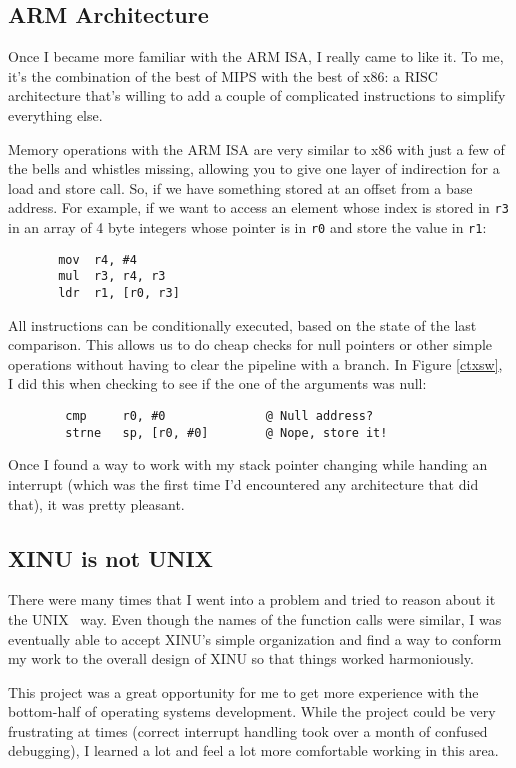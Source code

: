 \documentclass[12pt]{article}
\newcommand{\code}[1]{{\tt #1}}
\newcommand{\unix}[0]{U{\small NIX}}
\begin{document}
\subsection{ARM Architecture}

Once I became more familiar with the ARM ISA, I really came to like it. To me,
it's the combination of the best of MIPS with the best of x86: a RISC
architecture that's willing to add a couple of complicated instructions to
simplify everything else.

Memory operations with the ARM ISA are very similar to x86 with just a few of
the bells and whistles missing, allowing you to give one layer of indirection
for a load and store call. So, if we have something stored at an offset from a
base address. For example, if we want to access an element whose index is
stored in \code{r3} in an array of 4 byte integers whose pointer is in
\code{r0} and store the value in \code{r1}:

\begin{verbatim}
       mov  r4, #4
       mul  r3, r4, r3
       ldr  r1, [r0, r3]
\end{verbatim}

All instructions can be conditionally executed, based on the state of the last
comparison. This allows us to do cheap checks for null pointers or other simple
operations without having to clear the pipeline with a branch. In Figure
\ref{ctxsw}, I did this when checking to see if the one of the arguments was
null:

\begin{verbatim}
        cmp     r0, #0              @ Null address?
        strne   sp, [r0, #0]        @ Nope, store it!
\end{verbatim}

Once I found a way to work with my stack pointer changing while handing an
interrupt (which was the first time I'd encountered any architecture that did
that), it was pretty pleasant.

\subsection{XINU is not \unix}

There were many times that I went into a problem and tried to reason about it
the \unix~ way. Even though the names of the function calls were similar, I was
eventually able to accept XINU's simple organization and find a way to conform
my work to the overall design of XINU so that things worked harmoniously.

This project was a great opportunity for me to get more experience with the
bottom-half of operating systems development. While the project could be very
frustrating at times (correct interrupt handling took over a month of confused
debugging), I learned a lot and feel a lot more comfortable working in this
area.
\end{document}
